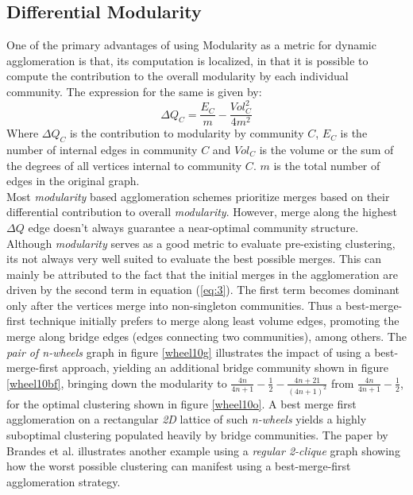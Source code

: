 \documentclass[conference]{IEEEtran}
\begin{document}
\subsection{Differential Modularity}
\label{diffmod}
One of the primary advantages of using Modularity as a metric for 
dynamic agglomeration is that, its computation is localized, in that it is 
possible to compute the contribution to the overall modularity by each 
individual community. The expression for the same is given by:
\begin{equation} \label{eq:3}
\Delta Q_C = \frac{E_C}{m} - \frac{Vol_C^2}{4m^2}
\end{equation}
Where $\Delta Q_C$ is the contribution to modularity by community $C$, $E_C$ is 
the number of internal edges in community $C$ and $Vol_C$ is the volume or the 
sum of the degrees of all vertices internal to community 
$C$. $m$ is the total number of edges in the original graph.\\
Most \emph{modularity} based agglomeration schemes prioritize merges based on 
their differential contribution to overall \emph{modularity}. However, merge 
along the highest $\Delta Q$ edge doesn't always guarantee a near-optimal 
community structure. Although \emph{modularity} serves as a good metric to 
evaluate pre-existing clustering, its not always very well suited to evaluate 
the best possible merges. This can mainly be attributed to the fact that the 
initial merges in the agglomeration are driven by the second term in equation
(\ref{eq:3}). The first term becomes dominant only after the vertices merge 
into 
non-singleton communities. Thus a best-merge-first technique initially prefers 
to merge along least volume edges, promoting the merge along bridge edges 
(edges connecting two communities), among others. The \emph{pair of 
n-wheels} graph in figure \ref{wheel10g} illustrates the impact of using a 
best-merge-first approach, yielding an additional bridge community shown in 
figure \ref{wheel10bf}, bringing down the modularity to 
$\frac{4n}{4n+1}-\frac{1}{2}-\frac{4n+21}{(4n+1)^2}$ from 
$\frac{4n}{4n+1}-\frac{1}{2}$, for the optimal clustering shown in figure 
\ref{wheel10o}. A best merge first agglomeration on a rectangular \emph{2D} 
lattice of such \emph{n-wheels} yields a highly suboptimal clustering 
populated heavily by bridge communities. The paper by Brandes et al. \cite{bran} 
illustrates another example using a \emph{regular 2-clique} graph showing 
how the worst possible clustering can manifest using a best-merge-first 
agglomeration strategy.\\
\end{document}
